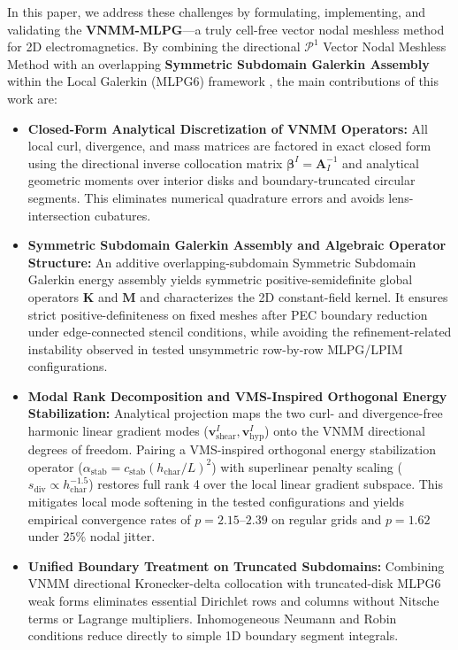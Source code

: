 \documentclass[VANCOUVER,Times1COL]{WileyNJD-v5}
\begin{document}
In this paper, we address these challenges by formulating, implementing, and validating the \textbf{VNMM-MLPG}---a truly cell-free vector nodal meshless method for 2D electromagnetics. By combining the directional $\mathcal{P}^1$ Vector Nodal Meshless Method \cite{ortiz2021nodal, stable_vnmm2d_2026} with an overlapping \textbf{Symmetric Subdomain Galerkin Assembly} within the Local Galerkin (MLPG6) framework \cite{atluri2002meshless}, the main contributions of this work are:
\begin{itemize}
    \item \textbf{Closed-Form Analytical Discretization of VNMM Operators:} All local curl, divergence, and mass matrices are factored in exact closed form using the directional inverse collocation matrix $\boldsymbol{\beta}^I = \mathbf{A}_I^{-1}$ and analytical geometric moments over interior disks and boundary-truncated circular segments. This eliminates numerical quadrature errors and avoids lens-intersection cubatures.
    \item \textbf{Symmetric Subdomain Galerkin Assembly and Algebraic Operator Structure:} An additive overlapping-subdomain Symmetric Subdomain Galerkin energy assembly yields symmetric positive-semidefinite global operators $\mathbf{K}$ and $\mathbf{M}$ and characterizes the 2D constant-field kernel. It ensures strict positive-definiteness on fixed meshes after PEC boundary reduction under edge-connected stencil conditions, while avoiding the refinement-related instability observed in tested unsymmetric row-by-row MLPG/LPIM configurations.
    \item \textbf{Modal Rank Decomposition and VMS-Inspired Orthogonal Energy Stabilization:} Analytical projection maps the two curl- and divergence-free harmonic linear gradient modes ($\mathbf{v}_{\mathrm{shear}}^I, \mathbf{v}_{\mathrm{hyp}}^I$) onto the VNMM directional degrees of freedom. Pairing a VMS-inspired orthogonal energy stabilization operator ($\alpha_{\mathrm{stab}} = c_{\mathrm{stab}}(h_{\mathrm{char}}/L)^2$) with superlinear penalty scaling ($s_{\mathrm{div}} \propto h_{\mathrm{char}}^{-1.5}$) restores full rank 4 over the local linear gradient subspace. This mitigates local mode softening in the tested configurations and yields empirical convergence rates of $p = 2.15\text{--}2.39$ on regular grids and $p = 1.62$ under $25\%$ nodal jitter.
    \item \textbf{Unified Boundary Treatment on Truncated Subdomains:} Combining VNMM directional Kronecker-delta collocation \cite{ortiz2021nodal, stable_vnmm2d_2026} with truncated-disk MLPG6 weak forms eliminates essential Dirichlet rows and columns without Nitsche terms or Lagrange multipliers. Inhomogeneous Neumann and Robin conditions reduce directly to simple 1D boundary segment integrals.

\end{itemize}
\end{document}
